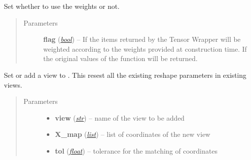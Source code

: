 \documentclass[a4paper,10pt,english]{sphinxmanual}
\begin{document}
\begin{fulllineitems}

\begin{fulllineitems}
\label{api-tw:TensorToolbox.core.TensorWrapper.set_active_weights}
Set whether to use the weights or not.
\begin{quote}\begin{description}
\item[{Parameters}] \leavevmode
\textbf{flag} (\href{http://docs.python.org/library/functions.html\#bool}{\emph{bool}}) -- If  the items returned by the Tensor Wrapper will be weighted according to the weights provided at construction time. If  the original values of the function will be returned.

\end{description}\end{quote}

\end{fulllineitems}


\begin{fulllineitems}
\label{api-tw:TensorToolbox.core.TensorWrapper.set_view}
Set or add a view to . This resest all the existing reshape parameters in existing views.
\begin{quote}\begin{description}
\item[{Parameters}] \leavevmode\begin{itemize}
\item {} 
\textbf{view} (\href{http://docs.python.org/library/functions.html\#str}{\emph{str}}) -- name of the view to be added

\item {} 
\textbf{X\_map} (\href{http://docs.python.org/library/functions.html\#list}{\emph{list}}) -- list of coordinates of the new view

\item {} 
\textbf{tol} (\href{http://docs.python.org/library/functions.html\#float}{\emph{float}}) -- tolerance for the matching of coordinates

\end{itemize}

\end{description}\end{quote}


\end{fulllineitems}
\end{fulllineitems}
\end{document}
